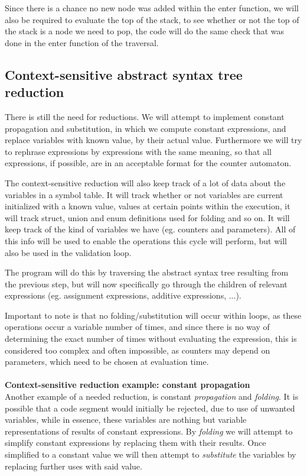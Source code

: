 \documentclass[12pt]{article}
\begin{document}
Since there is a chance no new node was added within the enter function, we will also be required to evaluate the top of the stack, to see whether or not the top of the stack is a node we need to pop, the code will do the same check that was done in the enter function of the traversal.

\subsection{Context-sensitive abstract syntax tree reduction}
There is still the need for reductions. We will attempt to implement constant propagation and substitution, in which we compute constant expressions, and replace variables with known value, by their actual value. Furthermore we will try to rephrase expressions by expressions with the same meaning, so that all expressions, if possible, are in an acceptable format for the counter automaton.

The context-sensitive reduction will also keep track of a lot of data about the variables in a symbol table. It will track whether or not variables are current initialized with a known value, values at certain points within the execution, it will track struct, union and enum definitions used for folding and so on. It will keep track of the kind of variables we have (eg. counters and parameters). All of this info will be used to enable the operations this cycle will perform, but will also be used in the validation loop.

The program will do this by traversing the abstract syntax tree resulting from the previous step, but will now specifically go through the children of relevant expressions (eg. assignment expressions, additive expressions, ...).

Important to note is that no folding/substitution will occur within loops, as these operations occur a variable number of times, and since there is no way of determining the exact number of times without evaluating the expression, this is considered too complex and often impossible, as counters may depend on parameters, which need to be chosen at evaluation time.\\
\\
\noindent
\textbf{Context-sensitive reduction example: constant propagation}\\
Another example of a needed reduction, is constant \textit{propagation} and \textit{folding}. It is possible that a code segment would initially be rejected, due to use of unwanted variables, while in essence, these variables are nothing but variable representations of results of constant expressions. By \textit{folding} we will attempt to simplify constant expressions by replacing them with their results. Once simplified to a constant value we will then attempt to \textit{substitute} the variables by replacing further uses with said value.
\end{document}
